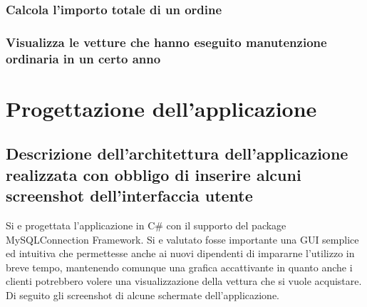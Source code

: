 \documentclass[11pt]{article}
\begin{document}
\subsubsection*{Calcola l’importo totale di un ordine}

\subsubsection*{Visualizza le vetture che hanno eseguito manutenzione ordinaria in un certo anno}

\section{Progettazione dell'applicazione}

\subsection{Descrizione dell'architettura dell'applicazione realizzata con
obbligo di inserire alcuni screenshot dell'interfaccia utente}

Si e progettata l'applicazione in C\# con il supporto del package
MySQLConnection Framework. Si e valutato fosse importante una GUI semplice ed
intuitiva che permettesse anche ai nuovi dipendenti di impararne l'utilizzo in
breve tempo, mantenendo comunque una grafica accattivante in quanto anche i
clienti potrebbero volere una visualizzazione della vettura che si vuole
acquistare.\\
Di seguito gli screenshot di alcune schermate dell'applicazione.
\end{document}
